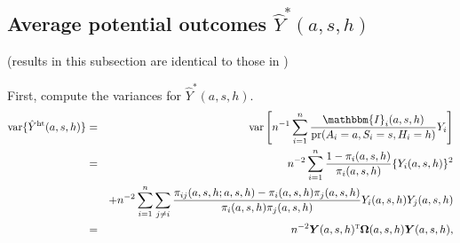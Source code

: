 \documentclass{article}
\def\T{{\textsc{t}}}
\newcommand{\pr}{\textup{pr}}
\newcommand{\var}{\textup{var}}
\newcommand{\bY}{\boldsymbol{Y}}
\newcommand{\bOmega}{\boldsymbol{\Omega}}
\newcommand{\sumi}{\sum_{i=1}^n}
\newcommand{\sumjneqi}{\sum_{j\neq i}}
\newcommand{\horthom}{\textup{ht}}
\newcommand{\bbI}{\mathbbm{I}}
\newcommand{\pscore}[1]{\pi_{#1}}
\begin{document}
\subsection{Average potential outcomes $\hat{Y}^{*}(a,s,h)$}
(results in this subsection are identical to those in \citet{aronow2017estimating})

First, compute the variances for $\hat{Y}^{*}(a,s,h)$.
\begin{eqnarray*}
    \var\{\hat{Y}^{\horthom}(a,s,h)\} &=& \var \left[ n^{-1}\sumi\frac{ \bbI_{i}(a,s,h) }{ \pr(A_{i}=a, S_{i}=s, H_{i}=h)}Y_{i}\right] \\
    &=& n^{-2}\sumi \frac{1 - \pscore{i}(a, s, h)}{\pscore{i}(a, s, h)}\{Y_i(a, s, h)\}^2 \\
    &&+ n^{-2}\sumi\sumjneqi\frac{\pscore{ij}(a, s, h; a, s, h) - \pscore{i}(a, s, h)\pscore{j}(a, s, h)}{\pscore{i}(a, s, h)\pscore{j}(a, s, h)}Y_i(a, s, h)Y_j(a, s, h) \\
    &=& n^{-2} \bY(a,s,h)^{\T} \bOmega(a,s,h) \bY(a,s,h),
\end{eqnarray*}
\end{document}

